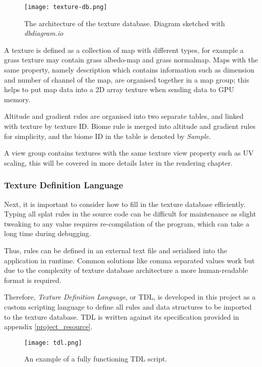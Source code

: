 \documentclass[oneside, a4paper]{report}
\begin{document}
    \begin{figure}[H]
        \texttt{[image: texture-db.png]}
        \caption{The architecture of the texture database. Diagram sketched with \textit{dbdiagram.io}}
        \label{texture_db}
    \end{figure}

    A texture is defined as a collection of map with different types, for example a grass texture may contain grass albedo-map and grass normalmap. Maps with the same property, namely description which contains information such as dimension and number of channel of the map, are organised together in a map group; this helps to put map data into a 2D array texture when sending data to GPU memory.

    Altitude and gradient rules are organised into two separate tables, and linked with texture by texture ID. Biome rule is merged into altitude and gradient rules for simplicity, and the biome ID in the table is denoted by \textit{Sample}.

    A view group contains textures with the same texture view property such as UV scaling, this will be covered in more details later in the rendering chapter.

    \subsubsection{Texture Definition Language}

    Next, it is important to consider how to fill in the texture database efficiently. Typing all splat rules in the source code can be difficult for maintenance as slight tweaking to any value requires re-compilation of the program, which can take a long time during debugging.

    Thus, rules can be defined in an external text file and serialised into the application in runtime. Common solutions like comma separated values work but due to the complexity of texture database architecture a more human-readable format is required.

    Therefore, \textit{Texture Definition Language}, or TDL, is developed in this project as a custom scripting language to define all rules and data structures to be imported to the texture database. TDL is written against its specification provided in appendix \ref{project_resource}.

    \begin{figure}[H]
        \texttt{[image: tdl.png]}
        \caption{An example of a fully functioning TDL script.}
        \label{tdl_script}
    \end{figure}
\end{document}
